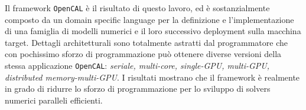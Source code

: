 \begin{otherlanguage}{nitalian}
Il framework \texttt{OpenCAL} è il risultato di questo lavoro, ed è sostanzialmente composto da un domain specific language per la definizione e l'implementazione di una famiglia di modelli numerici e il loro successivo deployment sulla macchina target.
Dettagli architetturali sono totalmente astratti dal programmatore che con pochissimo sforzo di programmazione può ottenere diverse versioni della stessa applicazione \texttt{OpenCAL}: \textit{seriale, multi-core, single-GPU, multi-GPU, distributed memory-multi-GPU}. I risultati mostrano che il framework è realmente in grado di ridurre lo sforzo di programmazione per lo sviluppo di solvers numerici paralleli efficienti.
\end{otherlanguage}

\endgroup

\vfill